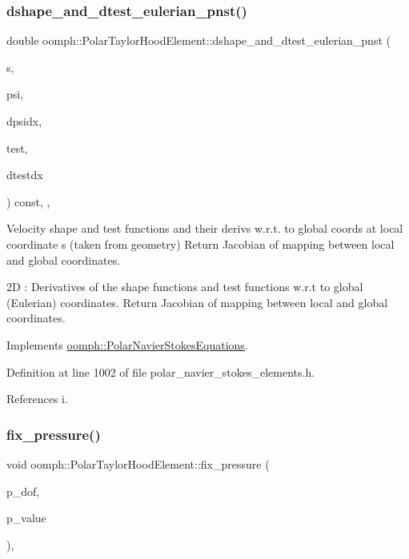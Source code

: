 \subsubsection{\texorpdfstring{dshape\+\_\+and\+\_\+dtest\+\_\+eulerian\+\_\+pnst()}{dshape\_and\_dtest\_eulerian\_pnst()}}
{\footnotesize\ttfamily double oomph\+::\+Polar\+Taylor\+Hood\+Element\+::dshape\+\_\+and\+\_\+dtest\+\_\+eulerian\+\_\+pnst (\begin{DoxyParamCaption}\item[{const \hyperlink{classoomph_1_1Vector}{Vector}$<$ double $>$ \&}]{s,  }\item[{\hyperlink{classoomph_1_1Shape}{Shape} \&}]{psi,  }\item[{\hyperlink{classoomph_1_1DShape}{D\+Shape} \&}]{dpsidx,  }\item[{\hyperlink{classoomph_1_1Shape}{Shape} \&}]{test,  }\item[{\hyperlink{classoomph_1_1DShape}{D\+Shape} \&}]{dtestdx }\end{DoxyParamCaption}) const\hspace{0.3cm}{\ttfamily [inline]}, {\ttfamily [protected]}, {\ttfamily [virtual]}}



Velocity shape and test functions and their derivs w.\+r.\+t. to global coords at local coordinate s (taken from geometry) Return Jacobian of mapping between local and global coordinates. 

2D \+: Derivatives of the shape functions and test functions w.\+r.\+t to global (Eulerian) coordinates. Return Jacobian of mapping between local and global coordinates. 

Implements \hyperlink{classoomph_1_1PolarNavierStokesEquations_a5be752caefa4421e221aaccd4712ec11}{oomph\+::\+Polar\+Navier\+Stokes\+Equations}.



Definition at line 1002 of file polar\+\_\+navier\+\_\+stokes\+\_\+elements.\+h.



References i.

\mbox{\label{classoomph_1_1PolarTaylorHoodElement_aea2da4c0a1114dacbf15d463da2f3d4f}} 
\subsubsection{\texorpdfstring{fix\+\_\+pressure()}{fix\_pressure()}}
{\footnotesize\ttfamily void oomph\+::\+Polar\+Taylor\+Hood\+Element\+::fix\+\_\+pressure (\begin{DoxyParamCaption}\item[{const unsigned \&}]{p\+\_\+dof,  }\item[{const double \&}]{p\+\_\+value }\end{DoxyParamCaption})\hspace{0.3cm}{\ttfamily [inline]}, {\ttfamily [virtual]}}



